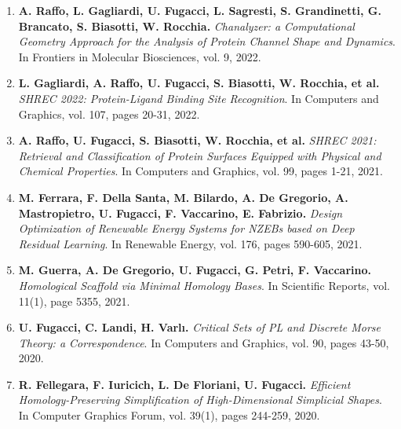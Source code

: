 \documentclass[11pt]{article}
\begin{document}
\begin{enumerate}

\item{\bf A. Raffo, L. Gagliardi, U. Fugacci, L. Sagresti, S. Grandinetti, G. Brancato, S. Biasotti, W. Rocchia.} {\em Chanalyzer: a Computational Geometry Approach for the Analysis of Protein Channel Shape and Dynamics}. In Frontiers in Molecular Biosciences, vol. 9, 2022.

\item{\bf L. Gagliardi, A. Raffo, U. Fugacci, S. Biasotti, W. Rocchia,
et al.
} {\em SHREC 2022: Protein-Ligand Binding Site Recognition}. In Computers and Graphics, vol. 107, pages 20-31, 2022.

\item {\bf A. Raffo, U. Fugacci, S. Biasotti, W. Rocchia,
et al.
} {\em SHREC 2021: Retrieval and Classification of Protein Surfaces Equipped with Physical and Chemical Properties}. In Computers and Graphics, vol. 99, pages 1-21, 2021.

\item {\bf M. Ferrara, F. Della Santa, M. Bilardo, A. De Gregorio, A. Mastropietro, U. Fugacci, F. Vaccarino, E. Fabrizio.} {\em Design Optimization of Renewable Energy Systems for NZEBs based on Deep Residual Learning}. In Renewable Energy, vol. 176, pages 590-605, 2021.

\item {\bf M. Guerra, A. De Gregorio, U. Fugacci, G. Petri, F. Vaccarino.} {\em Homological Scaffold via Minimal Homology Bases}. In Scientific Reports, vol. 11(1), page 5355, 2021.

\item {\bf U. Fugacci, C. Landi, H. Varl{\i}.} {\em Critical Sets of PL and Discrete Morse Theory: a Correspondence}. In Computers and Graphics, vol. 90, pages 43-50, 2020.

\item {\bf R. Fellegara, F. Iuricich, L. De Floriani, U. Fugacci.} {\em Efficient Homology-Preserving Simplification of High-Dimensional Simplicial Shapes}. In Computer Graphics Forum, vol. 39(1), pages 244-259, 2020.


\end{enumerate}
\end{document}
